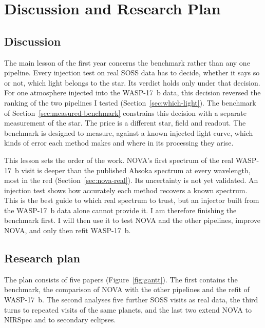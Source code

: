 \section{Discussion and Research Plan}
\label{sec:research-plan}

\subsection{Discussion}
\label{sec:discussion}

The main lesson of the first year concerns the benchmark rather than any one
pipeline. Every injection test on real SOSS data has to decide, whether it says so or not, which light
belongs to the star. Its verdict holds only under that
decision. For one atmosphere injected into the WASP-17~b data, this decision
reversed the ranking of the two pipelines I tested
(Section~\ref{sec:which-light}). The benchmark of
Section~\ref{sec:measured-benchmark} constrains this decision with a separate
measurement of the star. The price is a different star, field and readout. The
benchmark is designed to measure, against a known injected light curve, which
kinds of error each method makes and where in its processing they arise.

This lesson sets the order of the work. NOVA's first spectrum of the real
WASP-17~b visit is deeper than the published Ahsoka spectrum at every
wavelength, most in the red (Section~\ref{sec:nova-real}). Its
uncertainty is not yet validated. An injection test shows how accurately each method recovers a known spectrum. This is the best guide to which real spectrum to trust, but an injector built from the WASP-17~b data alone cannot provide it. I am therefore
finishing the benchmark first. I will then use it to test NOVA and the other
pipelines, improve NOVA, and only then refit WASP-17~b.

\subsection{Research plan}
\label{sec:plan}

The plan consists of five papers (Figure~\ref{fig:gantt}). The first contains
the benchmark, the comparison of NOVA with the other pipelines and the refit
of WASP-17~b. The second analyses five further SOSS visits as real data, the
third turns to repeated visits of the same planets, and the last two extend
NOVA to NIRSpec and to secondary eclipses.

